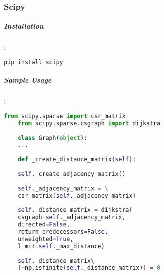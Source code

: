 	\subsubsection{Scipy}
	\subparagraph{Installation}:
	\begin{lstlisting}[language=bash]
	pip install scipy
	\end{lstlisting}
	
	\subparagraph{Sample Usage}:
	\begin{lstlisting}[language=python, caption=Scipy example]
	from scipy.sparse import csr_matrix
	from scipy.sparse.csgraph import dijkstra
	
	class Graph(object):
	...
	
	def _create_distance_matrix(self):
	
	self._create_adjacency_matrix()
	
	self._adjacency_matrix = \
	csr_matrix(self._adjacency_matrix)
	
	self._distance_matrix = dijkstra( 
	csgraph=self._adjacency_matrix, 
	directed=False, 
	return_predecessors=False, 
	unweighted=True,
	limit=self._max_distance)
	
	self._distance_matrix\ 
	[~np.isfinite(self._distance_matrix)] = 0
	\end{lstlisting}
